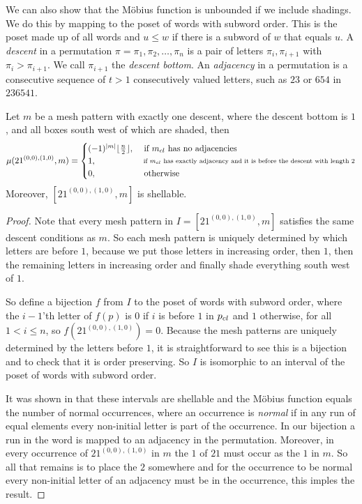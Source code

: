 \documentclass[11pt,a4paper,oneside]{article}
\begin{document}
We can also show that the M\"obius function is unbounded if we include shadings.
We do this by mapping to the poset of words with subword order.
This is the poset made up of all words and $u\le w$ if there is a subword of $w$
that equals $u$.
A \emph{descent} in a permutation $\pi=\pi_1,\pi_2,\ldots,\pi_n$ is a pair of
letters $\pi_i,\pi_{i+1}$ with $\pi_{i}>\pi_{i+1}$. We call $\pi_{i+1}$ the \emph{descent bottom}.
An \emph{adjacency} in a permutation is a consecutive sequence of $t>1$ consecutively valued letters,
such as $23$ or $654$ in $236541$.

\begin{lem}\label{lem:mobUn}
Let $m$ be a mesh pattern with exactly one descent, where the descent bottom is
$1$, and all boxes south west of which are shaded, then
\[
\mu(21^{(0,0),(1,0)},m)=\begin{cases}
(-1)^{|m|}\lfloor\frac{n}{2}\rfloor,&\text{ if } m_{cl} \text{ has no adjacencies}\\
1,&\substack{ \text{ if } m_{cl} \text{ has exactly adjacency and it is before the descent with length }2}\\
0, &\text{ otherwise}
\end{cases}
\]
Moreover, $[21^{(0,0),(1,0)},m]$ is shellable.
\begin{proof}
Note that every mesh pattern in $I=[21^{(0,0),(1,0)},m]$ satisfies the same
descent conditions as $m$. So each mesh pattern is uniquely determined by
which letters are before $1$, because we put those letters in increasing order,
then $1$, then the remaining letters in increasing order and finally shade
everything south west of $1$.

So define a bijection $f$ from $I$ to
the poset of words with subword order, where the $i-1$'th letter of $f(p)$ is $0$
if $i$ is before $1$ in $p_{cl}$ and $1$ otherwise, for all
$1<i\le n$, so $f(21^{(0,0),(1,0)})=0$.
Because the mesh patterns are uniquely determined by the letters before $1$,
it is straightforward to see this is a bijection and to
check that it is order preserving. So $I$ is isomorphic to an interval of the
poset of words with subword order.

 It was shown in \cite{Bjo90} that these
intervals are shellable and the M\"obius function equals the number of normal
occurrences, where an occurrence is \emph{normal} if in any run of equal elements every
non-initial letter is part of the occurrence. In our bijection a run in the word
is mapped to an adjacency in the permutation. Moreover, in every occurrence of
$21^{(0,0),(1,0)}$ in $m$ the $1$ of $21$ must occur as the $1$ in $m$. So
all that remains is to place the $2$ somewhere and for the occurrence to be normal
every non-initial letter of an adjacency must be in the occurrence, this imples the result.
\end{proof}
\end{lem}
\end{document}
